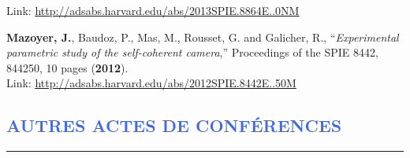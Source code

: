 \documentclass[11pt,a4paper, french]{article}
\begin{document}
\begin{etaremune}
Link: \textcolor{BrickRed}{\underline{\url{http://adsabs.harvard.edu/abs/2013SPIE.8864E..0NM}}}
\item \textbf{Mazoyer, J.}, Baudoz, P., Mas, M., Rousset, G. and Galicher, R., “\textit{Experimental parametric study of the self-coherent camera},” Proceedings of the SPIE 8442, 844250, 10 pages (\textbf{2012}).\\
Link: \textcolor{BrickRed}{\underline{\url{http://adsabs.harvard.edu/abs/2012SPIE.8442E..50M}}}


\end{etaremune}


\vspace{-0.8cm}
\textcolor{RoyalBlue}{\section{\large AUTRES ACTES DE CONFÉRENCES}
\vspace{-0.2cm}\hrule}
\vspace{0.4cm}
\end{document}
